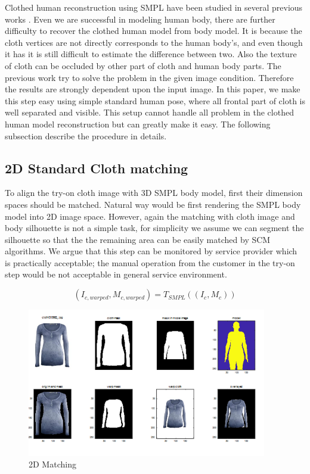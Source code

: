 Clothed human reconstruction using SMPL have been studied in several previous works \cite{Weng2018PhotoW3,Zanfir2018HumanAT}.
Even we are successful in modeling human body, there are further difficulty to recover the clothed human model from body model. It is because the cloth vertices are not directly corresponds to the human body's, and even though it has it is still difficult to estimate the difference between two. Also the texture of cloth can be occluded by other part of cloth and human body parts. The previous work try to solve the problem in the given image condition. Therefore the results are strongly dependent upon the input image.
In this paper, we make this step easy using simple standard human pose, where all frontal part of cloth is well separated and visible. This setup cannot handle all problem in the clothed human model reconstruction but can greatly make it easy.   
The following subsection describe the procedure in details.



\subsection{2D Standard Cloth matching}


To align the try-on cloth image with 3D SMPL body model\cite{Loper2015SMPLAS}, first their dimension spaces should be matched. Natural way would be first rendering the SMPL body model into 2D image space. However, again the matching with cloth image and body silhouette is not a simple task, for simplicity we assume we can segment the silhouette so that the the remaining area can be easily matched by SCM algorithms. We argue that this step can be monitored by service provider which is practically acceptable; the manual operation from the customer in the try-on step would be not acceptable in general service environment.   

\begin{equation}
(I_{c, warped}, M_{c, warped})  = T_{SMPL} ((I_c, M_c))
\end{equation}


\begin{figure}[t]
\centering
\includegraphics[height=6.5cm, scale=0.7]{figures/2dmatching.png}   %
\caption{2D Matching}
\label{fig:2DmatchingOfClothAndBody}
\end{figure}


